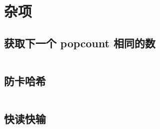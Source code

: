 \section{杂项}

\subsection{获取下一个 popcount 相同的数}

\inputminted{cpp}{icpc/misc/next_hamming/next_hamming.cpp}

\subsection{防卡哈希}

\inputminted{cpp}{icpc/misc/hash/hash.cpp}

\subsection{快读快输}

\inputminted{cpp}{icpc/misc/fastio/fastio.cpp}